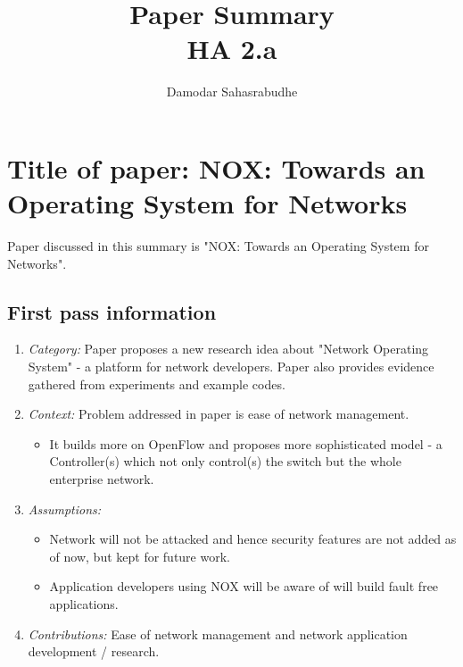\documentclass[letterpaper,twocolumn,10pt]{article}
\title{Paper Summary\\
HA 2.a\\}
\author{Damodar Sahasrabudhe}
\affil{School of Computing, University of Utah}
\begin{document}
\maketitle
\section{Title of paper: NOX: Towards an Operating System for Networks}
Paper discussed in this summary is "NOX: Towards an Operating System for Networks"\cite{NOX}.

\subsection{First pass information}
\label{sec:first}

\begin{enumerate}

\item {\it Category:} Paper proposes a new research idea about "Network Operating System" - a platform for network developers. Paper also provides evidence gathered from experiments and example codes.

\item {\it Context:} Problem addressed in paper is ease of network management. 
\begin{itemize}
\item It builds more on OpenFlow\cite{OpenFlow} and proposes more sophisticated model - a Controller(s) which not only control(s) the switch but the whole enterprise network.
\end{itemize}

\item {\it Assumptions:}  
\begin{itemize}
\item Network will not be attacked and hence security features are not added as of now, but kept for future work.
\item Application developers using NOX will be aware of will build fault free applications.
\end{itemize}

\item {\it Contributions:} Ease of network management and network application development / research.


\end{enumerate}
\end{document}
